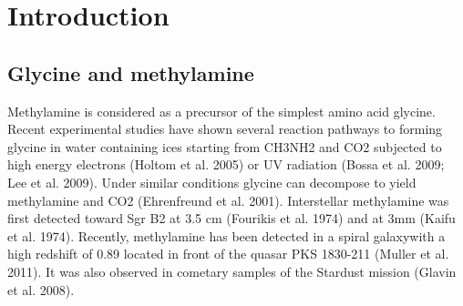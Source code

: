 \chapter{Introduction
  \label{chap:introduction}}



\section{Glycine and methylamine}
Methylamine is considered as
a precursor of the simplest amino acid glycine. Recent experimental
studies have shown several reaction pathways to forming
glycine in water containing ices starting from CH3NH2 and CO2
subjected to high energy electrons (Holtom et al. 2005) or UV
radiation (Bossa et al. 2009; Lee et al. 2009). Under similar conditions
glycine can decompose to yield methylamine and CO2
(Ehrenfreund et al. 2001). Interstellar methylamine was first detected
toward Sgr B2 at 3.5 cm (Fourikis et al. 1974) and at 3mm
(Kaifu et al. 1974). Recently, methylamine has been detected in
a spiral galaxywith a high redshift of 0.89 located in front of the
quasar PKS 1830-211 (Muller et al. 2011). It was also observed
in cometary samples of the Stardust mission (Glavin et al. 2008).


